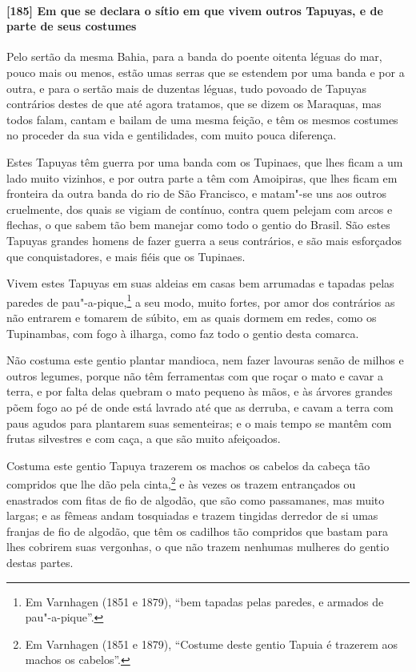 \paragraph{[185] Em que se declara o sítio em que vivem outros Tapuyas, e de parte de seus
costumes}\quad
Pelo sertão da mesma Bahia, para a banda do poente oitenta léguas do mar, pouco mais ou
menos, estão umas serras que se estendem por uma banda e por a outra, e para o sertão mais
de duzentas léguas, tudo povoado de Tapuyas contrários destes de que até agora tratamos,
que se dizem os Maraquas, mas todos falam, cantam e bailam de uma mesma feição, e têm os
mesmos costumes no proceder da sua vida e gentilidades, com muito pouca diferença.

Estes Tapuyas têm guerra por uma banda com os Tupinaes, que lhes ficam a um lado muito
vizinhos, e por outra parte a têm com Amoipiras, que lhes ficam em fronteira da outra
banda do rio de São Francisco, e matam"-se uns aos outros cruelmente, dos quais se vigiam
de contínuo, contra quem pelejam com arcos e flechas, o que sabem tão bem manejar como
todo o gentio do Brasil. São estes Tapuyas grandes homens de fazer guerra a seus
contrários, e são mais esforçados que conquistadores, e mais fiéis que os Tupinaes.

Vivem estes Tapuyas em suas aldeias em casas bem arrumadas e tapadas pelas paredes de
pau"-a-pique,\footnote{ Em Varnhagen (1851 e 1879), ``bem tapadas pelas paredes, e armados
de pau"-a-pique''.} a seu modo, muito fortes, por amor dos contrários as não entrarem e
tomarem de súbito, em as quais dormem em redes, como os Tupinambas, com fogo à ilharga,
como faz todo o gentio desta comarca.

Não costuma este gentio plantar mandioca, nem fazer lavouras senão de milhos e outros
legumes, porque não têm ferramentas com que roçar o mato e cavar a terra, e por falta
delas quebram o mato pequeno às mãos, e às árvores grandes põem fogo ao pé de onde está
lavrado até que as derruba, e cavam a terra com paus agudos para plantarem suas
sementeiras; e o mais tempo se mantêm com frutas silvestres e com caça, a que são muito
afeiçoados.

Costuma este gentio Tapuya trazerem os machos os cabelos da cabeça tão compridos que lhe
dão pela cinta,\footnote{ Em Varnhagen (1851 e 1879), ``Costume deste gentio Tapuia é
trazerem aos machos os cabelos''.} e às vezes os trazem entrançados ou enastrados com
fitas de fio de algodão, que são como passamanes, mas muito largas; e as fêmeas andam
tosquiadas e trazem tingidas derredor de si umas franjas de fio de algodão, que têm os
cadilhos tão compridos que bastam para lhes cobrirem suas vergonhas, o que não trazem
nenhumas mulheres do gentio destas partes.

